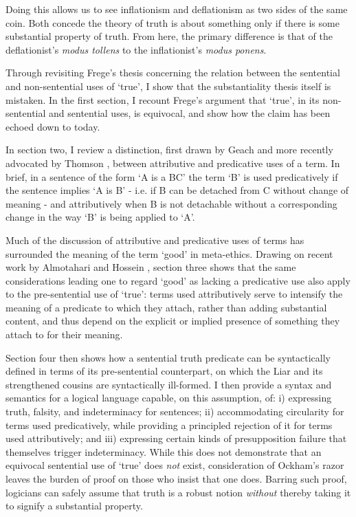 \documentclass[]{birkjour}
\begin{document}
Doing this allows us to see inflationism and deflationism as two sides of the same coin. Both concede the theory of truth is about something only if there is some substantial property of truth. From here, the primary difference is that of the deflationist's \textit{modus tollens} to the inflationist's \textit{modus ponens}.

Through revisiting Frege's thesis concerning the relation between the sentential and non-sentential uses of `true', I show that the substantiality thesis itself is mistaken. In the first section, I recount Frege's argument that `true', in its non-sentential and sentential uses, is equivocal, and show how the claim has been echoed down to today. 

In section two, I review a distinction, first drawn by Geach \cite{Geach1956} and more recently advocated by Thomson \cite{Thomson1997,Thomson2008}, between attributive and predicative uses of a term. In brief, in a sentence of the form `A is a BC' the term `B' is used predicatively if the sentence implies `A is B' - i.e. if B can be detached from C without change of meaning - and attributively when B is not detachable without a corresponding change in the way `B' is being applied to `A'. 

Much of the discussion of attributive and predicative uses of terms has surrounded the meaning of the term `good' in meta-ethics. Drawing on recent work by Almotahari and Hossein \cite{Almotahari2015}, section three shows that the same considerations leading one to regard `good' as lacking a predicative use also apply to the pre-sentential use of `true': terms used attributively serve to intensify the meaning of a predicate to which they attach, rather than adding substantial content, and thus depend on the explicit or implied presence of something they attach to for their meaning. 

Section four then shows how a sentential truth predicate can be syntactically defined in terms of its pre-sentential counterpart, on which the Liar and its strengthened cousins are syntactically ill-formed. I then provide a syntax and semantics for a logical language capable, on this assumption, of: i) expressing truth, falsity, and indeterminacy for sentences; ii) accommodating circularity for terms used predicatively, while providing a principled rejection of it for terms used attributively; and iii) expressing certain kinds of presupposition failure that themselves trigger indeterminacy. While this does not demonstrate that an equivocal sentential use of `true' does \textit{not} exist, consideration of Ockham's razor leaves the burden of proof on those who insist that one does. Barring such proof, logicians can safely assume that truth is a robust notion \textit{without} thereby taking it to signify a substantial property.
\printbibliography
\end{document}
